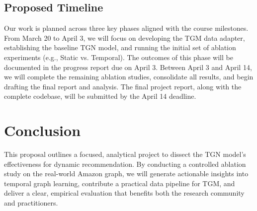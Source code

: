\documentclass[sigconf]{acmart}
\begin{document}
\subsection{Proposed Timeline}
Our work is planned across three key phases aligned with the course milestones. From March 20 to April 3, we will focus on developing the TGM data adapter, establishing the baseline TGN model, and running the initial set of ablation experiments (e.g., Static vs. Temporal). The outcomes of this phase will be documented in the progress report due on April 3. Between April 3 and April 14, we will complete the remaining ablation studies, consolidate all results, and begin drafting the final report and analysis. The final project report, along with the complete codebase, will be submitted by the April 14 deadline.

\section{Conclusion}
This proposal outlines a focused, analytical project to dissect the TGN model's effectiveness for dynamic recommendation. By conducting a controlled ablation study on the real-world Amazon graph, we will generate actionable insights into temporal graph learning, contribute a practical data pipeline for TGM, and deliver a clear, empirical evaluation that benefits both the research community and practitioners.



\end{document}
